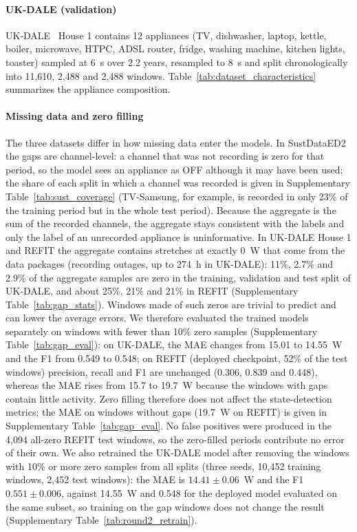 \documentclass[fleqn,10pt]{wlscirep}
\begin{document}
\paragraph{UK-DALE (validation)} UK-DALE~\cite{Kelly2015ukdale} House 1 contains 12 appliances (TV, dishwasher, laptop, kettle, boiler, microwave, HTPC, ADSL router, fridge, washing machine, kitchen lights, toaster) sampled at 6~s over 2.2 years, resampled to 8~s and split chronologically into 11,610, 2,488 and 2,488 windows. Table~\ref{tab:dataset_characteristics} summarizes the appliance composition.

\paragraph{Missing data and zero filling} The three datasets differ in how missing data enter the models. In SustDataED2 the gaps are channel-level: a channel that was not recording is zero for that period, so the model sees an appliance as OFF although it may have been used; the share of each split in which a channel was recorded is given in Supplementary Table~\ref{tab:sust_coverage} (TV-Samsung, for example, is recorded in only 23\% of the training period but in the whole test period). Because the aggregate is the sum of the recorded channels, the aggregate stays consistent with the labels and only the label of an unrecorded appliance is uninformative. In UK-DALE House 1 and REFIT the aggregate contains stretches at exactly 0~W that come from the data packages (recording outages, up to 274~h in UK-DALE): 11\%, 2.7\% and 2.9\% of the aggregate samples are zero in the training, validation and test split of UK-DALE, and about 25\%, 21\% and 21\% in REFIT (Supplementary Table~\ref{tab:gap_stats}). Windows made of such zeros are trivial to predict and can lower the average errors. We therefore evaluated the trained models separately on windows with fewer than 10\% zero samples (Supplementary Table~\ref{tab:gap_eval}): on UK-DALE, the MAE changes from 15.01 to 14.55~W and the F1 from 0.549 to 0.548; on REFIT (deployed checkpoint, 52\% of the test windows) precision, recall and F1 are unchanged (0.306, 0.839 and 0.448), whereas the MAE rises from 15.7 to 19.7~W because the windows with gaps contain little activity. Zero filling therefore does not affect the state-detection metrics; the MAE on windows without gaps (19.7~W on REFIT) is given in Supplementary Table~\ref{tab:gap_eval}. No false positives were produced in the 4,094 all-zero REFIT test windows, so the zero-filled periods contribute no error of their own. We also retrained the UK-DALE model after removing the windows with 10\% or more zero samples from all splits (three seeds, 10,452 training windows, 2,452 test windows): the MAE is $14.41\pm0.06$~W and the F1 $0.551\pm0.006$, against 14.55~W and 0.548 for the deployed model evaluated on the same subset, so training on the gap windows does not change the result (Supplementary Table~\ref{tab:round2_retrain}).
\end{document}
